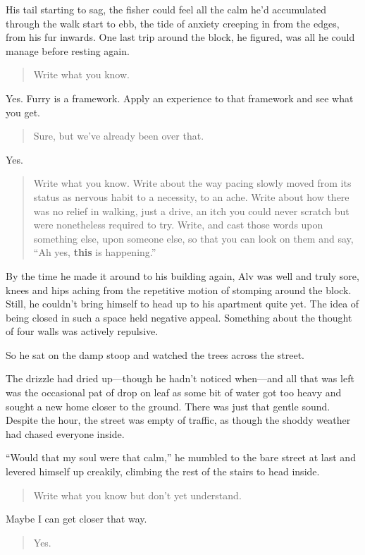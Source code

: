 His tail starting to sag, the fisher could feel all the calm he'd accumulated through the walk start to ebb, the tide of anxiety creeping in from the edges, from his fur inwards. One last trip around the block, he figured, was all he could manage before resting again.

\begin{quote}
Write what you know.
\end{quote}

Yes. Furry is a framework. Apply an experience to that framework and see what you get.

\begin{quote}
Sure, but we've already been over that.
\end{quote}

Yes.

\begin{quote}
Write what you know. Write about the way pacing slowly moved from its status as nervous habit to a necessity, to an ache. Write about how there was no relief in walking, just a drive, an itch you could never scratch but were nonetheless required to try. Write, and cast those words upon something else, upon someone else, so that you can look on them and say, ``Ah yes, \textbf{this} is happening.''
\end{quote}

By the time he made it around to his building again, Alv was well and truly sore, knees and hips aching from the repetitive motion of stomping around the block. Still, he couldn't bring himself to head up to his apartment quite yet. The idea of being closed in such a space held negative appeal. Something about the thought of four walls was actively repulsive.

So he sat on the damp stoop and watched the trees across the street.

The drizzle had dried up---though he hadn't noticed when---and all that was left was the occasional pat of drop on leaf as some bit of water got too heavy and sought a new home closer to the ground. There was just that gentle sound. Despite the hour, the street was empty of traffic, as though the shoddy weather had chased everyone inside.

``Would that my soul were that calm,'' he mumbled to the bare street at last and levered himself up creakily, climbing the rest of the stairs to head inside.

\begin{quote}
Write what you know but don't yet understand.
\end{quote}

Maybe I can get closer that way.

\begin{quote}
Yes.
\end{quote}
